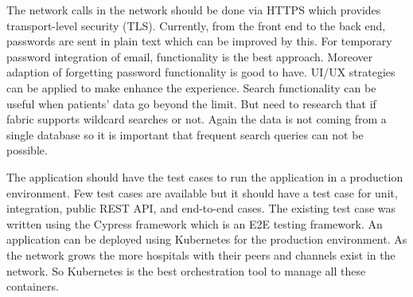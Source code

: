 The network calls in the network should be done via HTTPS which provides transport-level security (TLS). Currently, from the front end to the back end, passwords are sent in plain text which can be improved by this. For temporary password integration of email, functionality is the best approach. Moreover adaption of forgetting password functionality is good to have. UI/UX strategies can be applied to make enhance the experience. Search functionality can be useful when patients' data go beyond the limit. But need to research that if fabric supports wildcard searches or not. Again the data is not coming from a single database so it is important that frequent search queries can not be possible.

The application should have the test cases to run the application in a production environment. Few test cases are available but it should have a test case for unit, integration, public REST API, and end-to-end cases. The existing test case was written using the Cypress framework which is an E2E testing framework. An application can be deployed using Kubernetes for the production environment. As the network grows the more hospitals with their peers and channels exist in the network. So Kubernetes is the best orchestration tool to manage all these containers.
